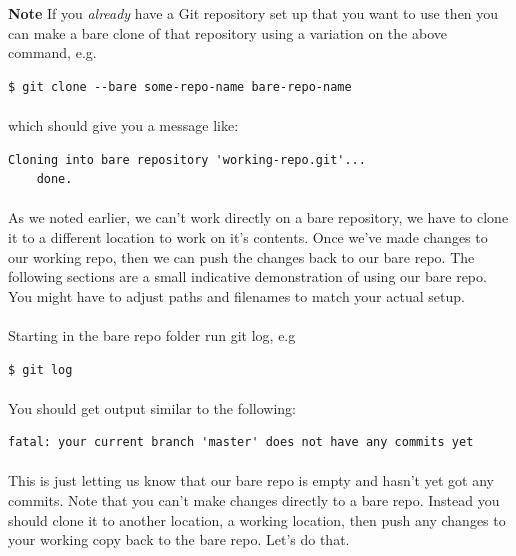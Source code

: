 \documentclass[12pt, a4paper, oneside]{book}
\begin{document}
\begin{framed}
\textbf{Note} If you \emph{already} have a Git repository set up that you want to use then you can make a bare clone of that repository using a variation on the above command, e.g.

\begin{lstlisting}[style=DOS]
    $ git clone --bare some-repo-name bare-repo-name
\end{lstlisting}

\paragraph{} which should give you a message like:

\begin{lstlisting}[style=DOS]
    Cloning into bare repository 'working-repo.git'...
    done.
\end{lstlisting}
\end{framed}

\paragraph{} As we noted earlier, we can't work directly on a bare repository, we have to clone it to a different location to work on it's contents. Once we've made changes to our working repo, then we can push the changes back to our bare repo. The following sections are a small indicative demonstration of using our bare repo. You might have to adjust paths and filenames to match your actual setup.

\paragraph{} Starting in the bare repo folder run git log, e.g

\begin{lstlisting}[style=DOS]
    $ git log
\end{lstlisting}

\paragraph{} You should get output similar to the following:

\begin{lstlisting}[style=DOS]
    fatal: your current branch 'master' does not have any commits yet
\end{lstlisting}

\paragraph{} This is just letting us know that our bare repo is empty and hasn't yet got any commits. Note that you can't make changes directly to a bare repo. Instead you should clone it to another location, a working location, then push any changes to your working copy back to the bare repo. Let's do that.
\end{document}
